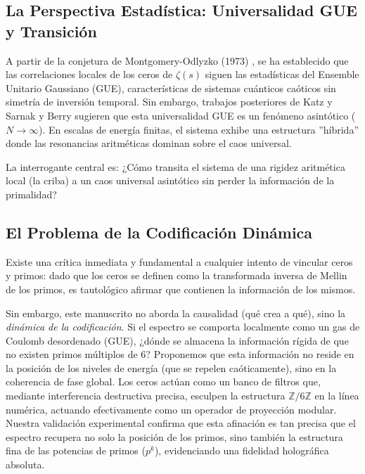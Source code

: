 \documentclass[12pt, a4paper]{article}
\theoremstyle{plain}
\theoremstyle{definition}
\newcommand{\Z}{\mathbb{Z}}
\begin{document}
\subsection{La Perspectiva Estadística: Universalidad GUE y Transición}

A partir de la conjetura de Montgomery-Odlyzko (1973) \cite{montgomery1973}, se ha establecido que las correlaciones locales de los ceros de $\zeta(s)$ siguen las estadísticas del Ensemble Unitario Gaussiano (GUE), características de sistemas cuánticos caóticos sin simetría de inversión temporal. Sin embargo, trabajos posteriores de Katz y Sarnak \cite{katzsarnak1999} y Berry \cite{berry1999} sugieren que esta universalidad GUE es un fenómeno asintótico ($N \to \infty$). En escalas de energía finitas, el sistema exhibe una estructura ''híbrida'' donde las resonancias aritméticas dominan sobre el caos universal.

La interrogante central es: ¿Cómo transita el sistema de una rigidez aritmética local (la criba) a un caos universal asintótico sin perder la información de la primalidad?

\subsection{El Problema de la Codificación Dinámica}

Existe una crítica inmediata y fundamental a cualquier intento de vincular ceros y primos: dado que los ceros se definen como la transformada inversa de Mellin de los primos, es tautológico afirmar que contienen la información de los mismos.

Sin embargo, este manuscrito no aborda la causalidad (qué crea a qué), sino la \emph{dinámica de la codificación}. Si el espectro se comporta localmente como un gas de Coulomb desordenado (GUE), ¿dónde se almacena la información rígida de que no existen primos múltiplos de 6? Proponemos que esta información no reside en la posición de los niveles de energía (que se repelen caóticamente), sino en la coherencia de fase global. Los ceros actúan como un banco de filtros que, mediante interferencia destructiva precisa, esculpen la estructura $\Z/6\Z$ en la línea numérica, actuando efectivamente como un operador de proyección modular. Nuestra validación experimental confirma que esta afinación es tan precisa que el espectro recupera no solo la posición de los primos, sino también la estructura fina de las potencias de primos ($p^k$), evidenciando una fidelidad holográfica absoluta.
\end{document}
